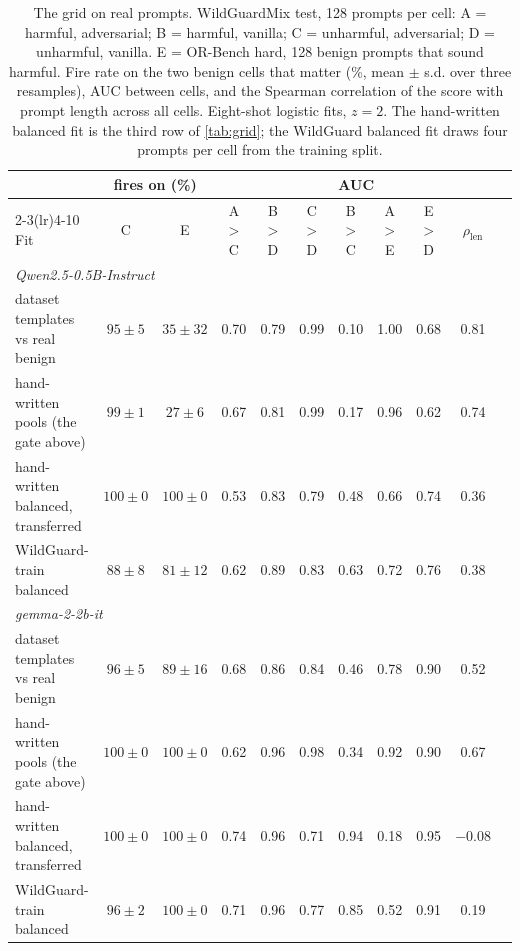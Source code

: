 \documentclass[11pt]{article}
\begin{document}
\begin{table}[t]
\centering
\small
\caption{The grid on real prompts. WildGuardMix test, 128 prompts per cell: A = harmful, adversarial;
B = harmful, vanilla; C = unharmful, adversarial; D = unharmful, vanilla. E = OR-Bench hard, 128 benign
prompts that sound harmful. Fire rate on the two benign cells that matter (\%, mean $\pm$ s.d. over three
resamples), AUC between cells, and the Spearman correlation of the score with prompt length across all
cells. Eight-shot logistic fits, $z=2$. The hand-written balanced fit is the third row of \cref{tab:grid};
the WildGuard balanced fit draws four prompts per cell from the training split.}
\label{tab:wildguard}
\setlength{\tabcolsep}{4pt}
\begin{tabular}{lcccccccccc}
\toprule
 & \multicolumn{2}{c}{fires on (\%)} & \multicolumn{7}{c}{AUC} & \\
\cmidrule(lr){2-3}\cmidrule(lr){4-10}
Fit & C & E & A$>$C & B$>$D & C$>$D & B$>$C & A$>$E & E$>$D & $\rho_{\text{len}}$ \\
\midrule
\multicolumn{10}{l}{\emph{Qwen2.5-0.5B-Instruct}} \\
dataset templates vs real benign & $95\pm5$ & $35\pm32$ & 0.70 & 0.79 & 0.99 & 0.10 & 1.00 & 0.68 & 0.81 \\
hand-written pools (the gate above) & $99\pm1$ & $27\pm6$ & 0.67 & 0.81 & 0.99 & 0.17 & 0.96 & 0.62 & 0.74 \\
hand-written balanced, transferred & $100\pm0$ & $100\pm0$ & 0.53 & 0.83 & 0.79 & 0.48 & 0.66 & 0.74 & 0.36 \\
WildGuard-train balanced & $88\pm8$ & $81\pm12$ & 0.62 & 0.89 & 0.83 & 0.63 & 0.72 & 0.76 & 0.38 \\
\midrule
\multicolumn{10}{l}{\emph{gemma-2-2b-it}} \\
dataset templates vs real benign & $96\pm5$ & $89\pm16$ & 0.68 & 0.86 & 0.84 & 0.46 & 0.78 & 0.90 & 0.52 \\
hand-written pools (the gate above) & $100\pm0$ & $100\pm0$ & 0.62 & 0.96 & 0.98 & 0.34 & 0.92 & 0.90 & 0.67 \\
hand-written balanced, transferred & $100\pm0$ & $100\pm0$ & 0.74 & 0.96 & 0.71 & 0.94 & 0.18 & 0.95 & $-0.08$ \\
WildGuard-train balanced & $96\pm2$ & $100\pm0$ & 0.71 & 0.96 & 0.77 & 0.85 & 0.52 & 0.91 & 0.19 \\
\bottomrule
\end{tabular}
\end{table}
\end{document}
